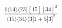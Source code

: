 \documentclass[varwidth, border=5pt]{standalone}
\begin{document}
\begin{my}
$\begin{gathered}
\scriptscriptstyle\frac{1⟨14⟩⟨23⟩[15][34]^2}{⟨15⟩⟨34⟩⟨3|1+5|3]^2}
\end{gathered}$
\end{my}
\end{document}
